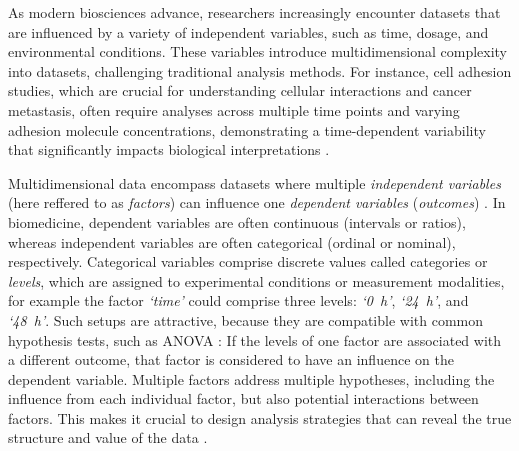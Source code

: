 

%
\label{sec:intro_multidimensional_data}%
As modern biosciences advance, researchers increasingly encounter datasets that
are influenced by a variety of independent variables, such as time, dosage, and
environmental conditions. These variables introduce multidimensional complexity
into datasets, challenging traditional analysis methods. For instance, cell
adhesion studies, which are crucial for understanding cellular interactions and
cancer metastasis, often require analyses across multiple time points and
varying adhesion molecule concentrations, demonstrating a time-dependent
variability that significantly impacts biological interpretations
\cite{reblTimedependentMetabolicActivity2010, mckayCellcellAdhesionMolecules1997,bolado-carrancioPeriodicPropagatingWaves2020a}.


Multidimensional data encompass datasets where multiple \emph{independent
    variables} (here reffered to as \emph{factors}) can influence one
\emph{dependent variables} (\emph{outcomes}) \cite{krzywinskiMultidimensionalData2013}.
In biomedicine, dependent variables are often continuous (intervals or ratios),
whereas independent variables are often categorical (ordinal or nominal),
respectively. Categorical variables comprise discrete values called categories
or \emph{levels}, which are assigned to experimental conditions or measurement
modalities, for example the factor \textit{`time'} could comprise three
levels: \textit{`\SI{0}{\hour}'}, \textit{`\SI{24}{\hour}'}, and
\textit{`\SI{48}{\hour}'}. Such setups are attractive, because they are
compatible with common hypothesis tests, such as ANOVA
\cite{motulskyIntuitiveBiostatisticsNonmathematical2017}: If the levels of one
factor are associated with a different outcome, that factor is considered to
have an influence on the dependent variable. Multiple factors address multiple
hypotheses, including the influence from each individual factor, but also
potential interactions between factors. This makes it crucial to design analysis
strategies that can reveal the true structure and value of the data
\cite{krzywinskiMultidimensionalData2013}.



